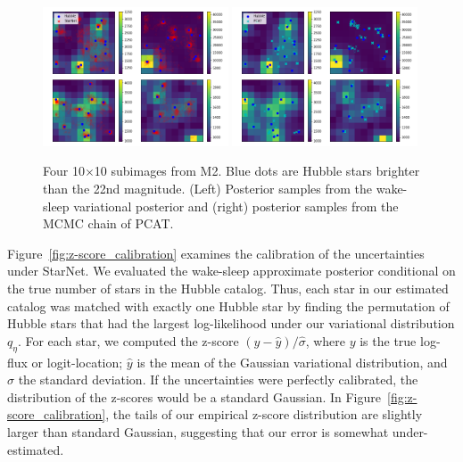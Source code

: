 \begin{figure}[H]
    \centering
    \includegraphics[width=0.49\textwidth]{figures/example_subimages_samples_ws.png}
    \includegraphics[width=0.49\textwidth]{figures/example_subimages_samples_pcat.png}
    \caption{Four 10$\times$10 subimages from
    M2. Blue dots are Hubble stars brighter than the 22nd magnitude. (Left) Posterior samples from the wake-sleep variational
    posterior and (right) posterior samples from the MCMC chain of PCAT. }
    \label{fig:example_subimages_sampled}
\end{figure}
\newpage

Figure~\ref{fig:z-score_calibration} examines the calibration of the uncertainties under StarNet. We evaluated the wake-sleep approximate posterior 
conditional on the true number of stars in the Hubble catalog. 
Thus, each star in our estimated catalog was matched with exactly one Hubble star
by finding the permutation of Hubble stars that had the largest log-likelihood under our variational distribution $q_\eta$. For each star, we computed the z-score $(y - \hat y) / \hat \sigma$, where $y$ is the true log-flux or 
logit-location; $\hat y$ is the mean of the Gaussian variational distribution, and $\hat\sigma$ the standard deviation.
If the uncertainties were perfectly calibrated, the distribution of the z-scores would be a standard Gaussian. 
In Figure~\ref{fig:z-score_calibration}, the tails of our empirical z-score distribution are slightly larger than standard Gaussian, suggesting that our error is somewhat under-estimated. 

